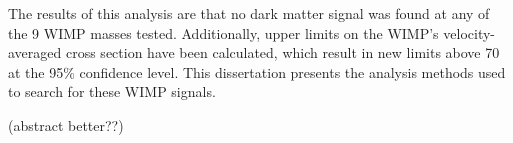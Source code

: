 The results of this analysis are that no dark matter signal was found at any of the 9 WIMP masses tested.
Additionally, upper limits on the WIMP's velocity-averaged cross section have been calculated, which result in new limits above \SI{70}{} at the 95\% confidence level.
This dissertation presents the analysis methods used to search for these WIMP signals.

{\color{red}(abstract better??)}







\cleartoevenpage[\thispagestyle{plain}]
\null
